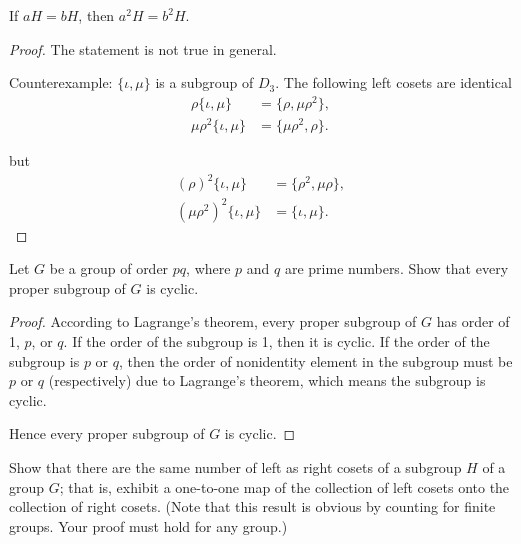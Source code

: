 \newpage
\begin{exercise}
    If $aH = bH$, then $a^{2}H = b^{2}H$.
\end{exercise}

\begin{proof}
    The statement is not true in general.

    Counterexample: $\{ \iota, \mu \}$ is a subgroup of $D_{3}$. The following left cosets are identical
    \begin{align*}
        \rho\{ \iota, \mu \}        & = \{ \rho, \mu\rho^{2} \}, \\
        \mu\rho^{2}\{ \iota, \mu \} & = \{ \mu\rho^{2}, \rho \}.
    \end{align*}

    but
    \begin{align*}
        {(\rho)}^{2}\{ \iota, \mu \}        & = \{ \rho^{2}, \mu\rho \}, \\
        {(\mu\rho^{2})}^{2}\{ \iota, \mu \} & = \{ \iota, \mu \}.
    \end{align*}
\end{proof}

\newpage
\begin{exercise}
    Let $G$ be a group of order $pq$, where $p$ and $q$ are prime numbers. Show that every proper subgroup of $G$ is cyclic.
\end{exercise}

\begin{proof}
    According to Lagrange's theorem, every proper subgroup of $G$ has order of 1, $p$, or $q$. If the order of the subgroup is 1, then it is cyclic. If the order of the subgroup is $p$ or $q$, then the order of nonidentity element in the subgroup must be $p$ or $q$ (respectively) due to Lagrange's theorem, which means the subgroup is cyclic.

    Hence every proper subgroup of $G$ is cyclic.
\end{proof}

\newpage
\begin{exercise}
    Show that there are the same number of left as right cosets of a subgroup $H$ of a group $G$; that is, exhibit a one-to-one map of the collection of left cosets onto the collection of right cosets. (Note that this result is obvious by counting for finite groups. Your proof must hold for any group.)
\end{exercise}


